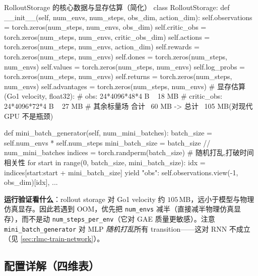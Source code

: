 \begin{codebox}[Python]{RolloutStorage 的核心数据与显存估算（简化）}
class RolloutStorage:
    def __init__(self, num_envs, num_steps, obs_dim, action_dim):
        self.observations = torch.zeros(num_steps, num_envs, obs_dim)
        self.critic_obs   = torch.zeros(num_steps, num_envs, critic_obs_dim)
        self.actions      = torch.zeros(num_steps, num_envs, action_dim)
        self.rewards      = torch.zeros(num_steps, num_envs)
        self.dones        = torch.zeros(num_steps, num_envs)
        self.values       = torch.zeros(num_steps, num_envs)
        self.log_probs    = torch.zeros(num_steps, num_envs)
        self.returns      = torch.zeros(num_steps, num_envs)
        self.advantages   = torch.zeros(num_steps, num_envs)
        # 显存估算(Go1 velocity, float32):
        # obs:        24*4096*48*4 B ~ 18 MB
        # critic_obs: 24*4096*72*4 B ~ 27 MB
        # 其余标量场 合计 ~60 MB  ->  总计 ~105 MB(对现代 GPU 不是瓶颈)

    def mini_batch_generator(self, num_mini_batches):
        batch_size = self.num_envs * self.num_steps
        mini_batch_size = batch_size // num_mini_batches
        indices = torch.randperm(batch_size)        # 随机打乱,打破时间相关性
        for start in range(0, batch_size, mini_batch_size):
            idx = indices[start:start + mini_batch_size]
            yield {"obs": self.observations.view(-1, obs_dim)[idx], ...}
\end{codebox}

\textbf{运行验证看什么}：rollout storage 对 Go1 velocity 约 $105\,$MB，远小于模型与物理仿真显存。因此若遇到 OOM，优先把 \verb|num_envs| 减半（直接减半物理仿真显存），而不是动 \verb|num_steps_per_env|（它对 GAE 质量更敏感）。注意 \verb|mini_batch_generator| 对 MLP \emph{随机打乱}所有 transition——这对 RNN 不成立（见 \cref{sec:rlmc-train-network}）。

\subsection{配置详解（四维表）}

